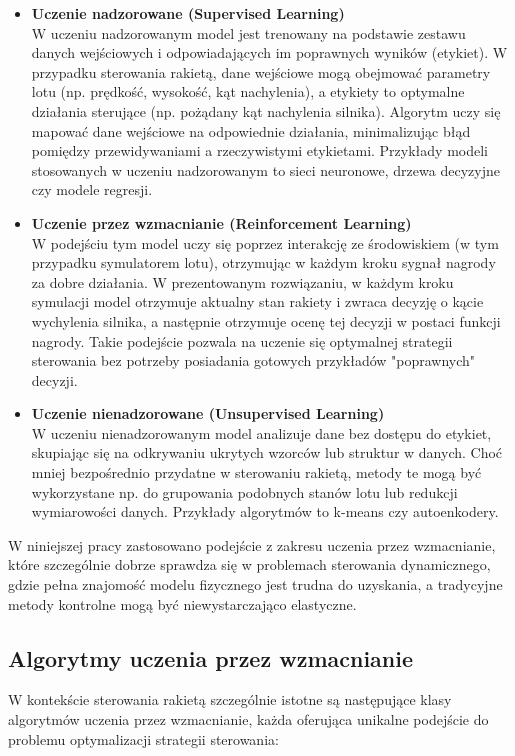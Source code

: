 \begin{itemize}
\item \textbf{Uczenie nadzorowane (Supervised Learning)} \\
W uczeniu nadzorowanym model jest trenowany na podstawie zestawu danych wejściowych i odpowiadających im poprawnych wyników (etykiet). W przypadku sterowania rakietą, dane wejściowe mogą obejmować parametry lotu (np. prędkość, wysokość, kąt nachylenia), a etykiety to optymalne działania sterujące (np. pożądany kąt nachylenia silnika). Algorytm uczy się mapować dane wejściowe na odpowiednie działania, minimalizując błąd pomiędzy przewidywaniami a rzeczywistymi etykietami. Przykłady modeli stosowanych w uczeniu nadzorowanym to sieci neuronowe, drzewa decyzyjne czy modele regresji.

\item \textbf{Uczenie przez wzmacnianie (Reinforcement Learning)} \\
W podejściu tym model uczy się poprzez interakcję ze środowiskiem (w tym przypadku symulatorem lotu), otrzymując w każdym kroku sygnał nagrody za dobre działania. W prezentowanym rozwiązaniu, w każdym kroku symulacji model otrzymuje aktualny stan rakiety i zwraca decyzję o kącie wychylenia silnika, a następnie otrzymuje ocenę tej decyzji w postaci funkcji nagrody. Takie podejście pozwala na uczenie się optymalnej strategii sterowania bez potrzeby posiadania gotowych przykładów "poprawnych" decyzji.

\item \textbf{Uczenie nienadzorowane (Unsupervised Learning)} \\
W uczeniu nienadzorowanym model analizuje dane bez dostępu do etykiet, skupiając się na odkrywaniu ukrytych wzorców lub struktur w danych. Choć mniej bezpośrednio przydatne w sterowaniu rakietą, metody te mogą być wykorzystane np. do grupowania podobnych stanów lotu lub redukcji wymiarowości danych. Przykłady algorytmów to k-means czy autoenkodery.
\end{itemize}


W niniejszej pracy zastosowano podejście z zakresu uczenia przez wzmacnianie, które szczególnie dobrze sprawdza się w problemach sterowania dynamicznego, gdzie pełna znajomość modelu fizycznego jest trudna do uzyskania, a tradycyjne metody kontrolne mogą być niewystarczająco elastyczne.

\subsection{Algorytmy uczenia przez wzmacnianie}
W kontekście sterowania rakietą szczególnie istotne są następujące klasy algorytmów uczenia przez wzmacnianie, każda oferująca unikalne podejście do problemu optymalizacji strategii sterowania:

